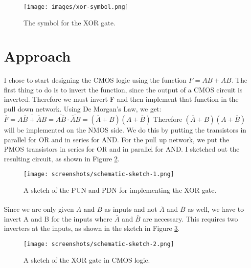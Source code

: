 \documentclass{article}
\begin{document}
  \begin{figure}[H]
    \centering
    \texttt{[image: images/xor-symbol.png]}
    \caption{The symbol for the XOR gate.}
    \label{fig:symbol}
  \end{figure}

\section{Approach}
  \paragraph{}
  I chose to start designing the CMOS logic using the function $F=A\overline{B}+\overline{A}B$. The first thing to do is to invert the function, since the output of a CMOS circuit is inverted. Therefore we must invert F and then implement that function in the pull down network. Using De Morgan's Law, we get: $\overline{F}=\overline{A\overline{B}+\overline{A}B}=\overline{A\overline{B}}\cdot\overline{\overline{A}B}=(\overline{A}+B)(A+\overline{B})$ Therefore $(\overline{A}+B)(A+\overline{B})$ will be implemented on the NMOS side. We do this by putting the transistors in parallel for OR and in series for AND. For the pull up network, we put the PMOS transistors in series for OR and in parallel for AND. I sketched out the resulting circuit, as shown in Figure \ref{fig:sketch1}.

  \begin{figure}[H]
    \centering
    \texttt{[image: screenshots/schematic-sketch-1.png]}
    \caption{A sketch of the PUN and PDN for implementing the XOR gate.}
    \label{fig:sketch1}
  \end{figure}

  \paragraph{}
  Since we are only given $A$ and $B$ as inputs and not $\overline{A}$ and $\overline{B}$ as well, we have to invert A and B for the inputs where $\overline{A}$ and $\overline{B}$ are necessary. This requires two inverters at the inputs, as shown in the sketch in Figure \ref{fig:sketch2}.


  \begin{figure}[H]
    \centering
    \texttt{[image: screenshots/schematic-sketch-2.png]}
    \caption{A sketch of the XOR gate in CMOS logic.}
    \label{fig:sketch2}
  \end{figure}
\end{document}

